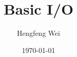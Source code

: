 \documentclass[]{beamer}
\title[Basic I/O]{Basic I/O}
\author[Hengfeng Wei]{Hengfeng Wei}
\institute{hfwei@nju.edu.cn}
\date{\today}
\begin{document}
\maketitle


\thankyou{}

\end{document}
